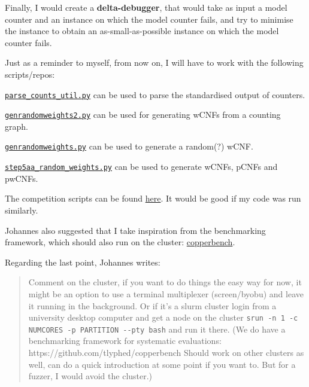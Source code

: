 \documentclass[a4paper]{tufte-handout}
\begin{document}
	Finally, I would create a {\bf delta-debugger}, that would take as input a model counter and an instance on which the model counter fails, and try to minimise the instance to obtain an as-small-as-possible instance on which the model counter fails.


	\noindent\hrulefill
	
	
	

	Just as a reminder to myself, from now on, I will have to work with the following scripts/repos:

	\begin{compactitem}
		\item \href{https://github.com/daajoe/mc_experiments/blob/main/eval/scripts/count_replication/parse_counts_util.py}{\texttt{parse\_counts\_util.py}} can be used to parse the standardised output of counters.
		\item \href{https://github.com/daajoe/mc_format_tools/blob/main/wmc_nnf_generator/genrandomweights2.py}{\texttt{genrandomweights2.py}} can be used for generating wCNFs from a counting graph.
		\item \href{https://github.com/daajoe/mc_format_tools/blob/main/wmc_nnf_generator/genrandomweights.py}{\texttt{genrandomweights.py}} can be used to generate a random(?) wCNF.
		\item \href{https://github.com/arijitsh/mccomp/blob/main/scripts/step5_prepare_instances/step5aa_random_weights.py}{\texttt{step5aa\_random\_weights.py}} can be used to generate wCNFs, pCNFs and pwCNFs. 
		\item The competition scripts can be found \href{https://github.com/daajoe/mc_experiments/tree/main/eval/scripts}{here}. It would be good if my code was run similarly.
		\item Johannes also suggested that I take inspiration from the benchmarking framework, which should also run on the cluster: \href{https://github.com/tlyphed/copperbench}{copperbench}.
	\end{compactitem}

	Regarding the last point, Johannes writes:

	\begin{quote}
		Comment on the cluster, if you want to do things the easy way for now, it might be an option to use a terminal multiplexer (screen/byobu) and leave it running in the background. 
		Or if it's a slurm cluster login from a university desktop computer and get a node on the cluster \verb|srun -n 1 -c NUMCORES -p PARTITION --pty bash| and run it there.
		(We do have a benchmarking framework for systematic evaluations: https://github.com/tlyphed/copperbench Should work on other clusters as well, can do a quick introduction at some point if you want to. But for a fuzzer, I would avoid the cluster.)
	\end{quote}
\end{document}
